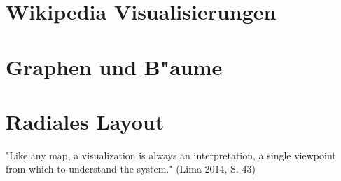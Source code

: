 



\section{Wikipedia Visualisierungen}
\section{Graphen und B"aume}
\section{Radiales Layout}

"Like any map, a visualization is always an interpretation, a single viewpoint from which to understand the system." (Lima 2014, S. 43)






